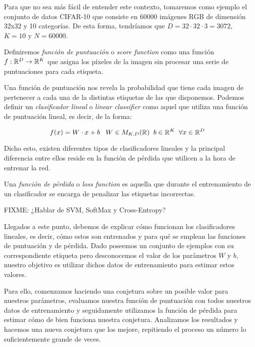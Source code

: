Para que no sea más fácil de entender este contexto, tomaremos como ejemplo el conjunto de datos CIFAR-10 que consiste en 60000 imágenes RGB de dimensión 32x32 y 10 categorías. De esta forma, tendríamos que $D=32\cdot 32 \cdot 3 = 3072$, $K=10$ y $N=60000$.

\begin{definicion}\label{def:ScoreFunction}
Definiremos \emph{función de puntuación} o \emph{score function} como una función $f:\mathbb{R}^D \to \mathbb{R}^K$ que asigna los píxeles de la imagen sin procesar una serie de puntuaciones para cada etiqueta.
\end{definicion}

Una función de puntuación nos revela la probabilidad que tiene cada imagen de pertenecer a cada una de la distintas etiquetas de las que disponemos. Podemos definir un \emph{clasificador lineal} o \emph{linear classifier} \label{def:LinearClassifier} como aquel que utiliza una función de puntuación lineal, es decir, de la forma:

$$f(x)=W\cdot x+ b\; \; \; W\in M_{K,D}(\mathbb{R}) \;\; b \in \mathbb{R}^K \;\; \forall x\in \mathbb{R}^D$$

Dicho esto, existen diferentes tipos de clasificadores lineales y la principal diferencia entre ellos reside en la función de pérdida que utilicen a la hora de entrenar la red.

\begin{definicion}\label{def:LossFunction}
Una \emph{función de pérdida} o \emph{loss function} es aquella que durante el entrenamiento de un clasificador se encarga de penalizar las etiquetas incorrectas.
\end{definicion}

FIXME: ¿Hablar de SVM, SoftMax y Cross-Entropy?\newline

Llegados a este punto, debemos de explicar cómo funcionan los clasificadores lineales, es decir, cómo estos son entrenados y para qué se emplean las funciones de puntuación y de pérdida. Dado poseemos un conjunto de ejemplos con su correspondiente etiqueta pero desconocemos el valor de los parámetros $W$ y $b$, nuestro objetivo es utilizar dichos datos de entrenamiento para estimar estos valores. \newline

Para ello, comenzamos haciendo una conjetura sobre un posible valor para nuestros parámetros, evaluamos nuestra función de puntuación con todos nuestros datos de entrenamiento y seguidamente utilizamos la función de pérdida para estimar cómo de bien funciona nuestra conjetura. Analizamos los resultados y hacemos una nueva conjetura que los mejore, repitiendo el proceso un número lo suficientemente grande de veces.\newline

